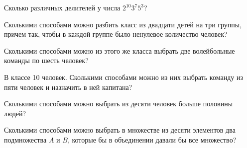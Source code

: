 \begin{problems}

\item
Сколько различных делителей у числа $2^{10} 3^{7} 5^{3}$?

\item
Сколькими способами можно разбить класс из двадцати детей на три группы,
причем так, чтобы в каждой группе было ненулевое количество человек?

\item
Сколькими способами можно из этого же класса выбрать две волейбольные команды
по шесть человек?

\item
В классе 10 человек.
Сколькими способами можно из них выбрать команду из пяти человек и назначить в
ней капитана?

\item
Сколькими способами можно выбрать из десяти человек больше половины людей? 

\item
Сколькими способами можно выбрать в множестве из десяти элементов два
подмножества $A$ и $B$, которые бы в объединении давали бы все множество?

\end{problems}

